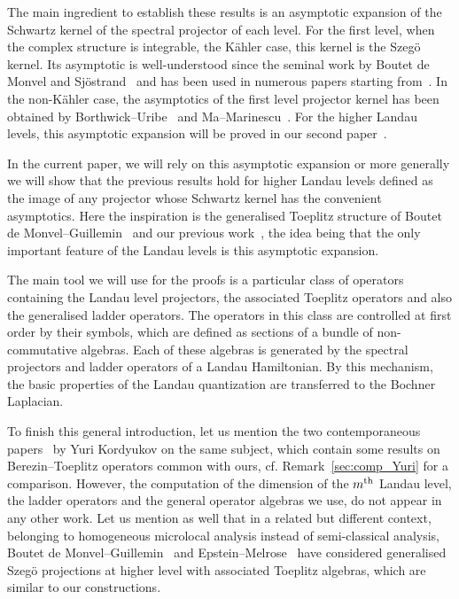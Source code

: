 \documentclass[10pt,a4paper]{article}
\theoremstyle{definition}
\numberwithin{equation}{section}
\begin{document}
The main ingredient to establish these results is an asymptotic expansion of the Schwartz kernel of the spectral projector of each level. For the first level, when the complex structure is integrable, the K\"ahler case, this kernel is the Szeg\"o kernel. Its asymptotic is well-understood since the seminal work by Boutet de Monvel and Sj\"ostrand~\cite{BoSj} and has been used in numerous papers starting from~\cite{BoGu,BoMeSc,Ze}. In the non-K\"ahler case, the asymptotics of the first level projector kernel has been obtained by Borthwick--Uribe~\cite{BoUr07} and Ma--Marinescu~\cite{MaMa08}. For the higher Landau levels, this asymptotic expansion will be proved in our second paper~\cite{oim_copain}.

In the current paper, we will rely on this asymptotic expansion or more generally we will show that the previous results hold for higher Landau levels defined as the image of any projector whose Schwartz kernel has the convenient asymptotics. Here the inspiration is the generalised Toeplitz structure of Boutet de Monvel--Guillemin~\cite{BoGu} and our previous work~\cite{oim}, the idea being that the only important feature of the Landau levels is this asymptotic expansion.

The main tool we will use for the proofs is a particular class of operators containing the Landau level projectors, the associated Toeplitz operators and also the generalised ladder operators. The operators in this class are controlled at first order by their symbols, which are defined as sections of a bundle of non-commutative algebras. Each of these algebras is generated by the spectral projectors and ladder operators of a Landau Hamiltonian. By this mechanism, the basic properties of the Landau quantization are transferred to the Bochner Laplacian.


To finish this general introduction, let us mention the two contemporaneous papers~\cite{Yuri_1,Yuri_2} by Yuri Kordyukov on the same subject,  which contain some results on Berezin--Toeplitz operators common with ours, cf. Remark~\ref{sec:comp_Yuri} for a comparison. However, the computation of the dimension of the $m^{\rm th}$ Landau level, the ladder operators and the general operator algebras we use, do not appear in any other work.  Let us mention as well that in a related but different context, belonging to homogeneous microlocal analysis instead of semi-classical analysis, Boutet de Monvel--Guillemin~\cite[Chapter~15]{BoGu} and Epstein--Melrose~\cite[Chapter~6]{EM} have considered generalised Szeg\"o projections at higher level with associated Toeplitz algebras, which are similar to our constructions.
\end{document}
